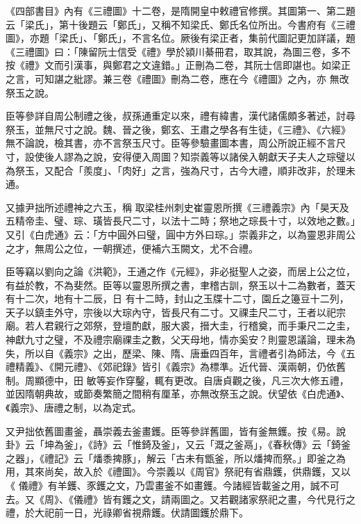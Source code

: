 \begin{pinyinscope}
 《四部書目》內有《三禮圖》十二卷，是隋開皇中敕禮官修撰。其圖第一、第二題云「梁氏」，第十後題云「鄭氏」，又稱不知梁氏、鄭氏名位所出。今書府有《三禮圖》，亦題「梁氏」、「鄭氏」，不言名位。厥後有梁正者，集前代圖記更加詳議，題《三禮圖》曰：「陳留阮士信受《禮》學於潁川綦冊君，取其說，為圖三卷，多不按《禮》文而引漢事，與鄭君之文違錯。」正刪為二卷，其阮士信即諶也。如梁正之言，可知諶之紕謬。兼三卷《禮圖》刪為二卷，應在今《禮圖》之內，亦
 無改祭玉之說。



 臣等參詳自周公制禮之後，叔孫通重定以來，禮有緯書，漢代諸儒頗多著述，討尋祭玉，並無尺寸之說。魏、晉之後，鄭玄、王肅之學各有生徒，《三禮》、《六經》無不論說，檢其書，亦不言祭玉尺寸。臣等參驗畫圖本書，周公所說正經不言尺寸，設使後人謬為之說，安得便入周圖？知崇義等以諸侯入朝獻天子夫人之琮璧以為祭玉，又配合「羨度」、「肉好」之言，強為尺寸，古今大禮，順非改非，於理未通。



 又據尹拙所述禮神之六玉，稱
 取梁桂州刺史崔靈恩所撰《三禮義宗》內「昊天及五精帝圭、璧、琮、璜皆長尺二寸，以法十二時；祭地之琮長十寸，以效地之數。」又引《白虎通》云：「方中圓外曰璧，圓中方外曰琮。」崇義非之，以為靈恩非周公之才，無周公之位，一朝撰述，便補六玉闕文，尤不合禮。



 臣等竊以劉向之論《洪範》，王通之作《元經》，非必挺聖人之姿，而居上公之位，有益於教，不為斐然。臣等以靈恩所撰之書，聿稽古訓，祭玉以十二為數者，蓋天有十二次，地有十二辰，日
 有十二時，封山之玉牒十二寸，園丘之籩豆十二列，天子以鎮圭外守，宗後以大琮內守，皆長尺有二寸。又祼圭尺二寸，王者以祀宗廟。若人君親行之郊祭，登壇酌獻，服大裘，搢大圭，行稽奠，而手秉尺二之圭，神獻九寸之璧，不及禮宗廟祼圭之數，父天母地，情亦奚安？則靈恩議論，理未為失，所以自《義宗》之出，歷梁、陳、隋、唐垂四百年，言禮者引為師法，今《五禮精義》、《開元禮》、《郊祀錄》皆引《義宗》為標準。近代晉、漢兩朝，仍依舊制。周顯德中，田
 敏等妄作穿鑿，輒有更改。自唐貞觀之後，凡三次大修五禮，並因隋朝典故，或節奏繁簡之間稍有厘革，亦無改祭玉之說。伏望依《白虎通》、《義宗》、唐禮之制，以為定式。



 又尹拙依舊圖畫釜，聶崇義去釜畫鑊。臣等參詳舊圖，皆有釜無鑊。按《易。說卦》云「坤為釜」，《詩》云「惟錡及釜」，又云「溉之釜鬲」，《春秋傳》云「錡釜之器」，《禮記》云「燔黍捭豚」，解云「古未有甑釜，所以燔捭而祭。」即釜之為用，其來尚矣，故入於《禮圖》。今崇義以《周官》祭祀有省鼎鑊，供鼎鑊，又以《
 儀禮》有羊鑊、豕鑊之文，乃雲畫釜不如畫鑊。今諸經皆載釜之用，誠不可去。又《周》、《儀禮》皆有鑊之文，請兩圖之。又若觀諸家祭祀之畫，今代見行之禮，於大祀前一日，光祿卿省視鼎鑊。伏請圖鑊於鼎下。




\end{pinyinscope}
